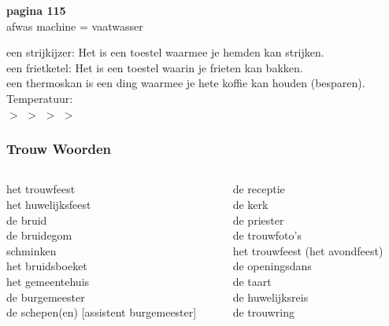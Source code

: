 \documentclass[usenames,dvipsnames]{beamer}
\begin{document}
	\begin{frame}
		\textbf{pagina 115}\\

		\hfill \break
		afwas machine = vaatwasser

		een strijkijzer: Het is een toestel waarmee je hemden kan strijken.\\
		een frietketel: Het is een toestel waarin je frieten kan bakken.\\
		een thermoskan is een ding waarmee je hete koffie kan houden (besparen).\\

		\hfill \break
		Temperatuur: \\
		\color{red}{heet} $>$ \color{pink}{warm} $>$ \color{white}{lauw} $>$ \color{ProcessBlue}{koud} $>$ \color{blue}{ijskoud}

	\end{frame}


	\begin{frame}
		\frametitle{Trouw Woorden}

		\begin{columns}
		\begin{column}{0.5\textwidth}
			het trouwfeest\\
			het huwelijksfeest\\

			\hfill \break
			de bruid\\
			de bruidegom\\

			\hfill \break
			schminken\\
			het bruidsboeket\\
			het gemeentehuis\\
			de burgemeester\\
			de schepen(en) [assistent burgemeester]\\

		\end{column}
		\begin{column}{0.5\textwidth}  %
			de receptie\\
			de kerk\\
			de priester\\

			\hfill \break
		  de trouwfoto's \\
			het trouwfeest (het avondfeest) \\
			de openingsdans \\
			de taart \\
			de huwelijksreis \\
			de trouwring \\
		\end{column}
		\end{columns}

	\end{frame}
\end{document}
